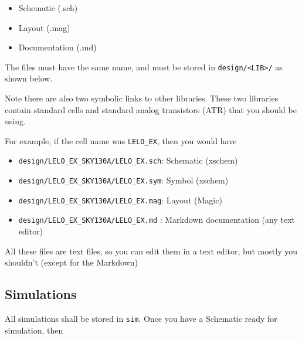\begin{itemize}
\tightlist
\item
  Schematic (.sch)
\item
  Layout (.mag)
\item
  Documentation (.md)
\end{itemize}

The files must have the same name, and must be stored in
\texttt{design/\textless{}LIB\textgreater{}/} as shown below.

Note there are also two symbolic links to other libraries. These two
libraries contain standard cells and standard analog transistors (ATR)
that you should be using.

\begin{Shaded}
\begin{Highlighting}[]
   \AttributeTok{{-}}\OperatorTok{\textgreater{}}
   \AttributeTok{{-}}\OperatorTok{\textgreater{}}
\end{Highlighting}
\end{Shaded}

For example, if the cell name was \texttt{LELO\_EX}, then you would have

\begin{itemize}
\tightlist
\item
  \texttt{design/LELO\_EX\_SKY130A/LELO\_EX.sch}: Schematic (xschem)
\item
  \texttt{design/LELO\_EX\_SKY130A/LELO\_EX.sym}: Symbol (xschem)
\item
  \texttt{design/LELO\_EX\_SKY130A/LELO\_EX.mag}: Layout (Magic)
\item
  \texttt{design/LELO\_EX\_SKY130A/LELO\_EX.md} : Markdown documentation
  (any text editor)
\end{itemize}

All these files are text files, so you can edit them in a text editor,
but mostly you shouldn't (except for the Markdown)

\subsection{Simulations}\label{simulations}

All simulations shall be stored in \texttt{sim}. Once you have a
Schematic ready for simulation, then

